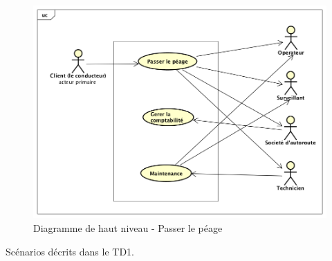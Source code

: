 \begin{figure}[h]
    \centering
    \includegraphics[scale=0.50]{02_Desenvolvimento/TD2/images/hautNiveau.png}
    \caption{Diagramme de haut niveau - Passer le péage}
    \label{fig:hautNiveau}
\end{figure}

Scénarios décrits dans le TD1.